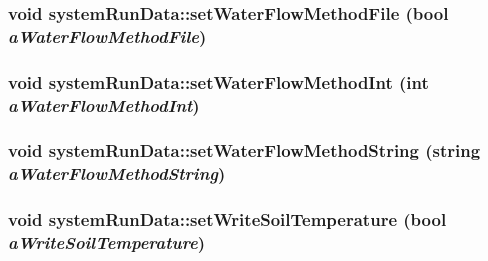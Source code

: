 \label{classsystem_run_data_ade3ec857e52f5dc77f5389dedb28c32d}
\hypertarget{classsystem_run_data_a4963e61ad97d6ee702e9e4f72cd0b85e}{
\subsubsection[{setWaterFlowMethodFile}]{\setlength{\rightskip}{0pt plus 5cm}void systemRunData::setWaterFlowMethodFile (bool {\em aWaterFlowMethodFile})}}
\label{classsystem_run_data_a4963e61ad97d6ee702e9e4f72cd0b85e}
\hypertarget{classsystem_run_data_aefe92f11ae01308c9a85056f47eb6153}{
\subsubsection[{setWaterFlowMethodInt}]{\setlength{\rightskip}{0pt plus 5cm}void systemRunData::setWaterFlowMethodInt (int {\em aWaterFlowMethodInt})}}
\label{classsystem_run_data_aefe92f11ae01308c9a85056f47eb6153}
\hypertarget{classsystem_run_data_acdcd8cbd189069d24e196122442dc628}{
\subsubsection[{setWaterFlowMethodString}]{\setlength{\rightskip}{0pt plus 5cm}void systemRunData::setWaterFlowMethodString (string {\em aWaterFlowMethodString})}}
\label{classsystem_run_data_acdcd8cbd189069d24e196122442dc628}
\hypertarget{classsystem_run_data_ab7a375c89f501b059a04e5b2d2cbfb91}{
\subsubsection[{setWriteSoilTemperature}]{\setlength{\rightskip}{0pt plus 5cm}void systemRunData::setWriteSoilTemperature (bool {\em aWriteSoilTemperature})}}
